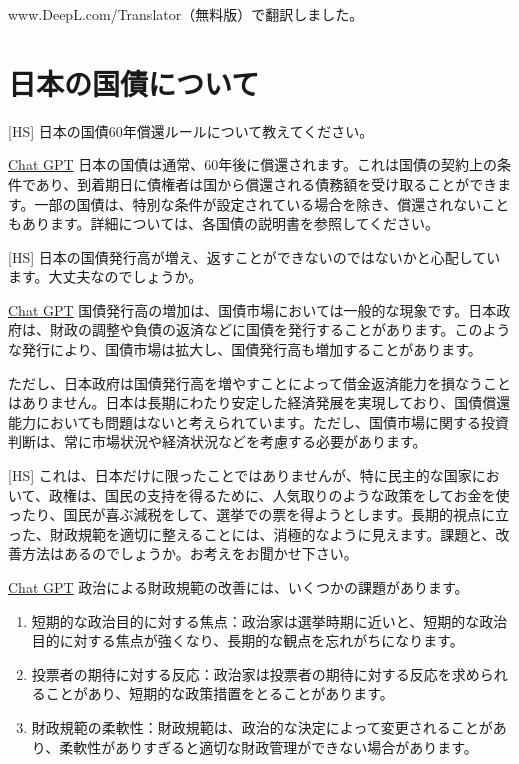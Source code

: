\documentclass[
]{book}
\providecommand{\tightlist}{%
  \setlength{\itemsep}{0pt}\setlength{\parskip}{0pt}}
\theoremstyle{definition}
\theoremstyle{definition}
\theoremstyle{definition}
\theoremstyle{definition}
\theoremstyle{remark}
\begin{document}
www.DeepL.com/Translator（無料版）で翻訳しました。

\hypertarget{nationalbond}{%
\section{日本の国債について　}\label{nationalbond}}

{[}HS{]} 日本の国債60年償還ルールについて教えてください。

\protect\hyperlink{chatgpt}{Chat GPT} 日本の国債は通常、60年後に償還されます。これは国債の契約上の条件であり、到着期日に債権者は国から償還される債務額を受け取ることができます。一部の国債は、特別な条件が設定されている場合を除き、償還されないこともあります。詳細については、各国債の説明書を参照してください。

{[}HS{]} 日本の国債発行高が増え、返すことができないのではないかと心配しています。大丈夫なのでしょうか。

\protect\hyperlink{chatgpt}{Chat GPT} 国債発行高の増加は、国債市場においては一般的な現象です。日本政府は、財政の調整や負債の返済などに国債を発行することがあります。このような発行により、国債市場は拡大し、国債発行高も増加することがあります。

ただし、日本政府は国債発行高を増やすことによって借金返済能力を損なうことはありません。日本は長期にわたり安定した経済発展を実現しており、国債償還能力においても問題はないと考えられています。ただし、国債市場に関する投資判断は、常に市場状況や経済状況などを考慮する必要があります。

{[}HS{]} これは、日本だけに限ったことではありませんが、特に民主的な国家において、政権は、国民の支持を得るために、人気取りのような政策をしてお金を使ったり、国民が喜ぶ減税をして、選挙での票を得ようとします。長期的視点に立った、財政規範を適切に整えることには、消極的なように見えます。課題と、改善方法はあるのでしょうか。お考えをお聞かせ下さい。

\protect\hyperlink{chatgpt}{Chat GPT} 政治による財政規範の改善には、いくつかの課題があります。

\begin{enumerate}
\def\labelenumi{\arabic{enumi}.}
\tightlist
\item
  短期的な政治目的に対する焦点：政治家は選挙時期に近いと、短期的な政治目的に対する焦点が強くなり、長期的な観点を忘れがちになります。
\item
  投票者の期待に対する反応：政治家は投票者の期待に対する反応を求められることがあり、短期的な政策措置をとることがあります。
\item
  財政規範の柔軟性：財政規範は、政治的な決定によって変更されることがあり、柔軟性がありすぎると適切な財政管理ができない場合があります。
\end{enumerate}
\end{document}
